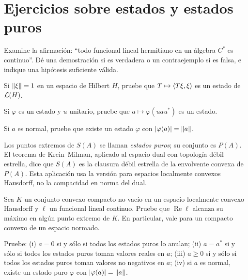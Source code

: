 \section{Ejercicios sobre estados y estados puros}

\begin{ejercicio}\label{ej:v3-l28-1}
Examine la afirmación: ``todo funcional lineal hermitiano en un álgebra $C^*$ es continuo''. Dé una demostración si es verdadera o un contraejemplo si es falsa, e indique una hipótesis suficiente válida.
\end{ejercicio}


\begin{ejercicio}\label{ej:v3-l28-2}
Si $\left\lVert\xi\right\rVert=1$ en un espacio de Hilbert $H$, pruebe que $T\mapsto\left\langle T\xi,\xi\right\rangle$ es un estado de $\mathcal L(H)$.
\end{ejercicio}


\begin{ejercicio}\label{ej:v3-l28-3}
Si $\varphi$ es un estado y $u$ unitario, pruebe que $a\mapsto\varphi(uau^*)$ es un estado.
\end{ejercicio}


\begin{ejercicio}\label{ej:v3-l28-4}
Si $a$ es normal, pruebe que existe un estado $\varphi$ con $|\varphi(a)|=\left\lVert a\right\rVert$.
\end{ejercicio}


Los puntos extremos de $S(A)$ se llaman \emph{estados puros}; su conjunto es $P(A)$. El teorema de Krein--Milman, aplicado al espacio dual con topología débil estrella, dice que $S(A)$ es la clausura débil estrella de la envolvente convexa de $P(A)$. Esta aplicación usa la versión para espacios localmente convexos Hausdorff, no la compacidad en norma del dual.

\begin{ejercicio}\label{ej:v3-l28-5}
Sea $K$ un conjunto convexo compacto no vacío en un espacio localmente convexo Hausdorff y $\ell$ un funcional lineal continuo. Pruebe que $\operatorname{Re}\ell$ alcanza su máximo en algún punto extremo de $K$. En particular, vale para un compacto convexo de un espacio normado.
\end{ejercicio}


\begin{ejercicio}\label{ej:v3-l28-6}
Pruebe: (i) $a=0$ si y sólo si todos los estados puros lo anulan; (ii) $a=a^*$ si y sólo si todos los estados puros toman valores reales en $a$; (iii) $a\ge0$ si y sólo si todos los estados puros toman valores no negativos en $a$; (iv) si $a$ es normal, existe un estado puro $\varphi$ con $|\varphi(a)|=\left\lVert a\right\rVert$.
\end{ejercicio}


